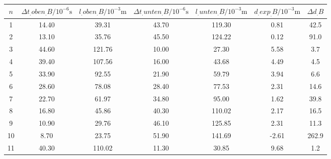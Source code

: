 \label{tab:tabBScan}
	\begin{tabular}{S[table-format=1.0]S[table-format=2.2]S[table-format=2.2]S[table-format=2.2]S[table-format=2.2]S[table-format=2.2]S[table-format=2.1]}
		\toprule
		{$n$} & {$\Delta t_.{oben_.{B} }/10^{-6}\si{\second}$} & {$l_.{oben_.{B}}/10^{-3}\si{\metre}$} & {$\Delta t_.{unten_.{B}}/10^{-6}\si{\second}$} & {$l_.{unten_.{B}}/10^{-3}\si{\metre}$} & {$d_.{exp_.{B}}/10^{-3}\si{\metre}$} &{$\Delta d_.B$} \\
		 & 14.40 & 39.31 & 43.70 & 119.30 & 0.81 & 42.5 \\
		2 & 13.10 & 35.76 & 45.50 & 124.22 & 0.12 & 91.0 \\
		3 & 44.60 & 121.76 & 10.00 & 27.30 & 5.58 & 3.7 \\
		4 & 39.40 & 107.56 & 16.00 & 43.68 & 4.49 & 4.5 \\
		5 & 33.90 & 92.55 & 21.90 & 59.79 & 3.94 & 6.6 \\
		6 & 28.60 & 78.08 & 28.40 & 77.53 & 2.31 & 14.6 \\
		7 & 22.70 & 61.97 & 34.80 & 95.00 & 1.62 & 39.8 \\
		8 & 16.80 & 45.86 & 40.30 & 110.02 & 2.17 & 16.5 \\
		9 & 10.90 & 29.76 & 46.10 & 125.85 & 2.31 & 11.3 \\
		10 & 8.70 & 23.75 & 51.90 & 141.69 & -2.61 & 262.9 \\
		11 & 40.30 & 110.02 & 11.30 & 30.85 & 9.68 & 1.2 \\
		\bottomrule
	\end{tabular}
